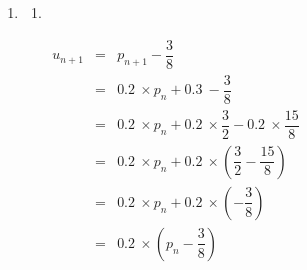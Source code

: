 \documentclass[10pt]{article}
\providecommand{\N}{\mathbb{N}}
\providecommand{\np}[2][]{{#2~#1}}
\begin{document}
\begin{enumerate}
\begin{enumerate}
\textbf{On vérifie que $\mathcal{H}(0)$ est vraie (initialisation).}

Comme $p_0 = 0 \leqslant \np{0.375}$,  $\mathcal{H}(0)$ est vraie.

\textbf{Montrons que $\mathcal{H}(n)\Rightarrow \mathcal{H}(n+1)$ (hérédité).}

On suppose que $\mathcal{H}(n)$ est vraie, avec $n \in \N$.

$p_{n+1} = \np{0.2}\times p_n + \np{0.3}$

D'après $\mathcal{H}(n)$, $p_n \leqslant \np{0.375}$, en multipliant par $\np{0.2}$ on obtient :

$ \np{0.2}\times p_n \leqslant \np{0.075}$, en ajoutant  $\np{0.3}$ on obtient :

$ \np{0.2}\times p_n + \np{0.3} \leqslant \np{0.375}$, ainsi on obtient :

$p_{n+1} \leqslant \np{0.375} $ ($\mathcal{H}(n+1)$ est vérifiée)

\textbf{D'après le principe de récurrence},

$\forall n\in \N, n \geqslant 0, p_n\leqslant \np{0.375}$
		\item Pour tout $n\in \N$, $p_n$ désignant une probabilité est un nombre positif.

Soit ${n\in\N}$

$p_{n+1}-p_{n} = \np{-0.8}\times p_n + \np{0.3} $

$p_{n+1}-p_{n} \geqslant \np{-0.8}\times \np{0.375} + \np{0.3} $

$p_{n+1}-p_{n} \geqslant 0 $

Ceci étant valable quelque soit le choix de $n$, $\forall n \in \N,~p_{n+1}-p_{n} \geqslant 0 $, donc $\left(p_n\right)$ est croissante.
			\item $\left(p_n\right)$ est croissante et majorée donc $\left(p_n\right)$ est convergente vers $l$. De plus ${l\leqslant \np{0.375}}$.
		\end{enumerate}
	\item
		\begin{enumerate}
			\item \ {}
			
			\renewcommand{\arraystretch}{2}
			$\begin{array}{rcl}
			u_{n+1} 	&=& p_{n+1} - \dfrac{3}{8}\\
					&=& \np{0.2}\times p_n + \np{0.3} - \dfrac{3}{8}\\
					&=& \np{0.2}\times p_n +\np{0.2}\times \dfrac{3}{2} - \np{0.2}\times\dfrac{15}{8}\\
					&=& \np{0.2}\times p_n +\np{0.2}\times\left( \dfrac{3}{2} - \dfrac{15}{8}\right)\\
					&=& \np{0.2}\times p_n +\np{0.2}\times\left(  - \dfrac{3}{8}\right)\\
					&=& \np{0.2}\times \left(p_n - \dfrac{3}{8}\right)\\
			\end{array}$


\end{enumerate}
\end{enumerate}
\end{document}
